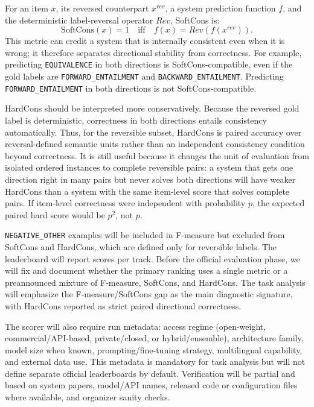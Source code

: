 \documentclass[11pt]{article}
\begin{document}
For an item \(x\), its reversed counterpart \(x^{rev}\), a system prediction function \(f\), and the deterministic label-reversal operator \(Rev\), SoftCons is:
\[
  \text{SoftCons}(x)=1 \quad \text{iff} \quad f(x)=Rev(f(x^{rev})).
\]
This metric can credit a system that is internally consistent even when it is wrong; it therefore separates directional stability from correctness.
For example, predicting \texttt{EQUIVALENCE} in both directions is SoftCons-compatible, even if the gold labels are \texttt{FORWARD\_ENTAILMENT} and \texttt{BACKWARD\_ENTAILMENT}.
Predicting \texttt{FORWARD\_ENTAILMENT} in both directions is not SoftCons-compatible.

HardCons should be interpreted more conservatively.
Because the reversed gold label is deterministic, correctness in both directions entails consistency automatically.
Thus, for the reversible subset, HardCons is paired accuracy over reversal-defined semantic units rather than an independent consistency condition beyond correctness.
It is still useful because it changes the unit of evaluation from isolated ordered instances to complete reversible pairs: a system that gets one direction right in many pairs but never solves both directions will have weaker HardCons than a system with the same item-level score that solves complete pairs.
If item-level correctness were independent with probability \(p\), the expected paired hard score would be \(p^2\), not \(p\).

\texttt{NEGATIVE\_OTHER} examples will be included in F-measure but excluded from SoftCons and HardCons, which are defined only for reversible labels.
The leaderboard will report scores per track.
Before the official evaluation phase, we will fix and document whether the primary ranking uses a single metric or a preannounced mixture of F-measure, SoftCons, and HardCons.
The task analysis will emphasize the F-measure/SoftCons gap as the main diagnostic signature, with HardCons reported as strict paired directional correctness.

The scorer will also require run metadata:
access regime (open-weight, commercial/API-based, private/closed, or hybrid/ensemble), architecture family, model size when known, prompting/fine-tuning strategy, multilingual capability, and external data use.
This metadata is mandatory for task analysis but will not define separate official leaderboards by default.
Verification will be partial and based on system papers, model/API names, released code or configuration files where available, and organizer sanity checks.
\end{document}
